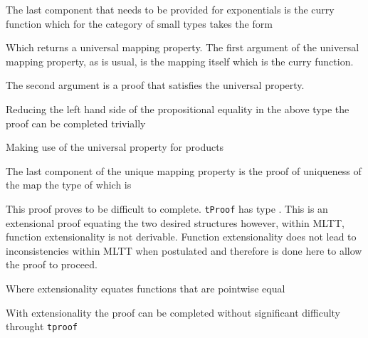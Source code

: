 
The last component that needs to be provided for exponentials is the curry
function which for the category of small types takes the form


Which returns a universal mapping property. The first argument of the universal
mapping property, as is
usual, is the mapping itself which is the curry function.



The second argument is a proof that  satisfies the
universal property.


Reducing the left hand side of the propositional equality in the above type the
proof can be completed trivially


Making use of the universal property for products


The last component of the unique mapping property is the proof of uniqueness of
the map the type of which is


This proof proves to be difficult to complete. \verb|tProof| has type
. This is an extensional proof equating the two desired structures
however, within MLTT, function extensionality is not derivable. Function extensionality
does not lead to inconsistencies within MLTT when postulated and therefore is
done here to allow the proof to proceed.


Where extensionality equates functions that are pointwise equal


With extensionality the proof can be completed without significant difficulty
throught \verb|tproof|


